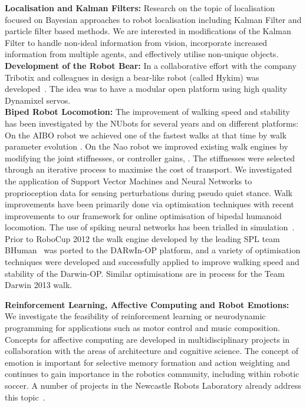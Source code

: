 \documentclass{llncs}
\begin{document}
\noindent\textbf{Localisation and Kalman Filters:} Research on the
topic of localisation focused on Bayesian approaches to robot
localisation including Kalman Filter and particle filter
based methods. We are interested in 
modifications of the Kalman Filter to handle non-ideal information
from vision, incorporate increased information from multiple agents, 
and effectively utilise non-unique objects.
\\

\noindent\textbf{Development of the Robot Bear:} In a collaborative
effort with the company Tribotix and colleagues in design a
bear-like robot (called Hykim) was developed~\cite{ChalupEtAl2006}. The idea was to have a modular open platform using high quality Dynamixel servos. 
\\

\noindent\textbf{Biped Robot Locomotion:} The improvement of walking speed and stability has been investigated by the NUbots for several years and on different platforms: On the AIBO robot we achieved one of the fastest walks at that time by walk parameter evolution \cite{QuinlanEtAlACRA2003,ChalupEtAlSMC2007}. On the Nao robot we improved existing walk engines by modifying the joint stiffnesses, or controller gains, \cite{Kulk2008,Kulk2010,Kulk2010a}. The stiffnesses were selected through an iterative process to maximise the cost of transport. We investigated the application of Support Vector Machines and Neural Networks to proprioception data for sensing perturbations during pseudo quiet stance. Walk improvements have been primarily done via optimisation techniques \cite{Kulk2011a,Kulk2011b} with recent improvements to our framework for online optimisation of bipedal humanoid locomotion. 
The use of spiking neural networks has been trialled in simulation~\cite{WiklendtChalup2008}. Prior to RoboCup 2012 the walk engine developed by the leading SPL team BHuman~\cite{BHumanWalk2010} was ported to the DARwIn-OP platform, and a variety of optimisation techniques were developed and successfully applied to improve walking speed and stability of the Darwin-OP. Similar optimisations are in process for the Team Darwin 2013 walk.

\noindent\textbf{Reinforcement Learning, Affective Computing and Robot Emotions:} We investigate the feasibility of reinforcement learning or neurodynamic programming for applications such as motor control and music composition. Concepts for affective computing are developed in multidisciplinary projects in collaboration with the areas of architecture and cognitive science. The concept of emotion is important for selective memory formation and action weighting and continues to gain importance in the robotics community, including within robotic soccer. A number of projects in the Newcastle Robots Laboratory already address this topic~\cite{ANFA2012,Pareidolia2010,HongEtAl2013a,HongEtAl2013b,WongEtAl2013}. 
\\
\end{document}

